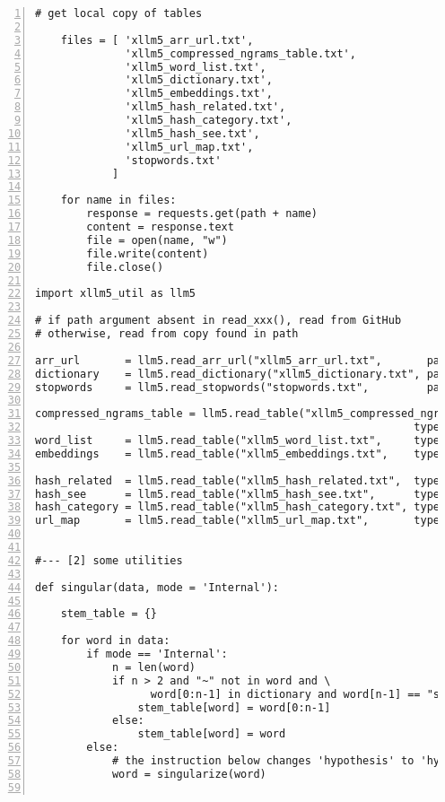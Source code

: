 \documentclass[oneside,10pt]{book}
\begin{document}
\begin{lstlisting}[numbers=left]
    # get local copy of tables

    files = [ 'xllm5_arr_url.txt', 
              'xllm5_compressed_ngrams_table.txt',
              'xllm5_word_list.txt',
              'xllm5_dictionary.txt',
              'xllm5_embeddings.txt',
              'xllm5_hash_related.txt',
              'xllm5_hash_category.txt',
              'xllm5_hash_see.txt',
              'xllm5_url_map.txt',
              'stopwords.txt'
            ]

    for name in files:
        response = requests.get(path + name)
        content = response.text
        file = open(name, "w")
        file.write(content)
        file.close()  

import xllm5_util as llm5

# if path argument absent in read_xxx(), read from GitHub
# otherwise, read from copy found in path

arr_url       = llm5.read_arr_url("xllm5_arr_url.txt",       path="")
dictionary    = llm5.read_dictionary("xllm5_dictionary.txt", path="")
stopwords     = llm5.read_stopwords("stopwords.txt",         path="")

compressed_ngrams_table = llm5.read_table("xllm5_compressed_ngrams_table.txt", 
                                                           type="list", path="")
word_list     = llm5.read_table("xllm5_word_list.txt",     type="list", path="")
embeddings    = llm5.read_table("xllm5_embeddings.txt",    type="hash", path="", 
                                                                 format="float") 
hash_related  = llm5.read_table("xllm5_hash_related.txt",  type="hash", path="")
hash_see      = llm5.read_table("xllm5_hash_see.txt",      type="hash", path="")
hash_category = llm5.read_table("xllm5_hash_category.txt", type="hash", path="")
url_map       = llm5.read_table("xllm5_url_map.txt",       type="hash", path="")


#--- [2] some utilities

def singular(data, mode = 'Internal'):

    stem_table = {}

    for word in data:
        if mode == 'Internal': 
            n = len(word)
            if n > 2 and "~" not in word and \
                  word[0:n-1] in dictionary and word[n-1] == "s":
                stem_table[word] = word[0:n-1]
            else:
                stem_table[word] = word
        else:
            # the instruction below changes 'hypothesis' to 'hypothesi'
            word = singularize(word)


\end{lstlisting}
\end{document}
